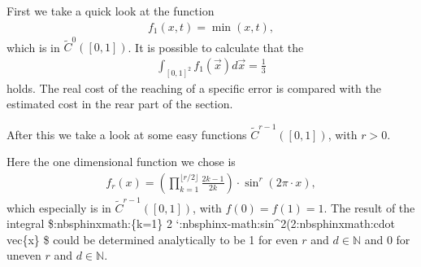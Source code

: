 \documentclass[letterpaper,10pt,english]{sphinxmanual}
\begin{document}
First we take a quick look at the function
\begin{equation*}
\begin{split}f_1(x,t) = \min(x,t),\end{split}
\end{equation*}
which is in \(\tilde{C}^{0}([0,1])\). It is possible to calculate that the
\begin{equation*}
\begin{split}\int_{[0,1]^{2}} f_1(\vec{x}) d\vec{x} = \frac{1}{3}\end{split}
\end{equation*}
holds. The real cost of the reaching of a specific error is compared with the estimated cost in the rear part of the section.

After this we take a look at some easy functions \(\tilde{C}^{r-1}([0,1])\), with \(r>0\).

Here the one dimensional function we chose is
\begin{equation*}
\begin{split}f_{r} (x)=\left(\prod^{\lfloor r/2\rfloor}_{k = 1} \frac{2k-1}{2k}\right) \cdot \sin^r(2\pi \cdot x),\end{split}
\end{equation*}
which especially is in \(\tilde{C}^{r-1}([0,1])\), with \(f(0)=f(1)=1.\) The result of the integral \$:nbsphinx\sphinxhyphen{}math:\{k=1\} 2 \cdot `:nbsphinx-math:sin\textasciigrave{}\textasciicircum{}2(2:nbsphinx\sphinxhyphen{}math:cdot vec\{x\}\textasciigrave{} \$ could be determined analytically to be 1 for even \(r\) and \(d \in \mathbb{N}\) and 0 for uneven \(r\) and \(d \in \mathbb{N}\).
\end{document}
